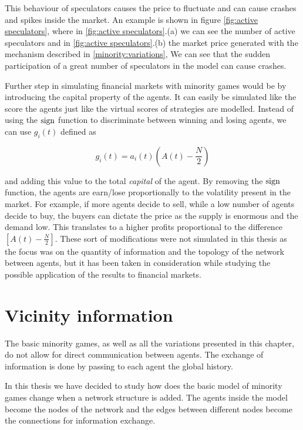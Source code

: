 This behaviour of speculators causes the price to fluctuate and can cause crashes and spikes inside the market.
An example is shown in figure \ref{fig:active speculators}, where in \ref{fig:active speculators}.(a) we can see the number of active speculators and in \ref{fig:active speculators}.(b) the market price generated with the mechanism described in \ref{minority:variations},
We can see that the sudden participation of a great number of speculators in the model can cause crashes. 

Further step in simulating financial markets with minority games would be by introducing the capital property of the agents.
It can easily be simulated like the score the agents just like the virtual scores of strategies are modelled.
Instead of using the $\operatorname{sign}$ function to discriminate between winning and losing agents, we can use $g_i(t)$ defined as

\begin{displaymath}
g_i(t)=a_i(t)(A(t) - \frac{N}{2})
\end{displaymath}

and adding this value to the total \textit{capital} of the agent.
By removing the $\operatorname{sign}$ function, the agents are earn/lose proportionally to the volatility present in the market. 
For example, if more agents decide to sell, while a low number of agents decide to buy, the buyers can dictate the price as the supply is enormous and the demand low.
This translates to a higher profits proportional to the difference $[A(t)-\frac{N}{2}]$.
These sort of modifications were not simulated in this thesis as the focus was on the quantity of information and the topology of the network between agents, but it has been taken in consideration while studying the possible application of the results to financial markets. 

\section{Vicinity information}
\label{minority:vicinity}

The basic minority games, as well as all the variations presented in this chapter, do not allow for direct communication between agents.
The exchange of information is done by passing to each agent the global history.

In this thesis we have decided to study how does the basic model of minority games change when a network structure is added.
The agents inside the model become the nodes of the network and the edges between different nodes become the connections for information exchange.

